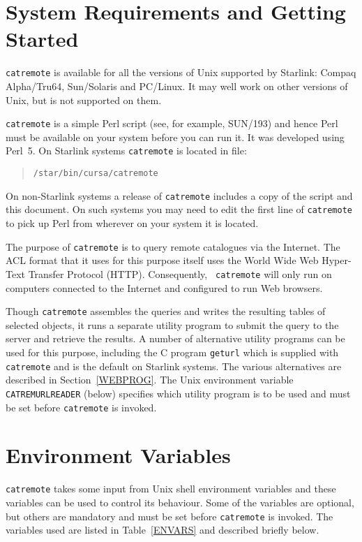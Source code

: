 \documentclass[twoside,11pt]{article}
\newcommand{\xref}[3]{#1}
\newcommand{\xlabel}[1]{}
\renewcommand{\_}{\texttt{\symbol{95}}}
\begin{document}
\section{\xlabel{SYSREQ}\label{SYSREQ}System Requirements and Getting
Started}

{\tt catremote} is available for all the versions of Unix supported by
Starlink: Compaq Alpha/Tru64, Sun/Solaris and PC/Linux.  It may well work
on other versions of Unix, but is not supported on them.

{\tt catremote} is a simple Perl script (see, for example,
\xref{SUN/193}{sun193}{}\cite{SUN193}) and hence Perl must be
available on your system before you can run it.  It was developed using
Perl~5.  On Starlink systems {\tt catremote} is located in file:

\begin{quote}
{\tt /star/bin/cursa/catremote}
\end{quote}

On non-Starlink systems a release of {\tt catremote} includes a copy
of the script and this document.  On such systems you may need to edit
the first line of {\tt catremote} to pick up Perl from wherever on your
system it is located.

The purpose of {\tt catremote} is to query remote catalogues via the
Internet.  The ACL format that it uses for this purpose itself uses the
World Wide Web Hyper-Text Transfer Protocol (HTTP).  Consequently, {\tt
catremote} will only run on computers connected to the Internet and
configured to run Web browsers.

Though {\tt catremote} assembles the queries and writes the resulting
tables of selected objects, it runs a separate utility program to submit
the query to the server and retrieve the results.  A number of alternative
utility programs can be used for this purpose, including the C program
{\tt geturl} which is supplied with {\tt catremote} and is the default on
Starlink systems.  The various alternatives are described in
Section~\ref{WEBPROG}.  The Unix environment variable {\tt CATREM\_URLREADER}
(below) specifies which utility program is to be used and must be set
before {\tt catremote} is invoked.


\section{\xlabel{ENVIR}\label{ENVIR}Environment Variables}

{\tt catremote} takes some input from Unix shell environment variables
and these variables can be used to control its behaviour.  Some of the
variables are optional, but others are mandatory and must be set before
{\tt catremote} is invoked.  The variables used are listed in
Table~\ref{ENVARS} and described briefly below.
\end{document}
